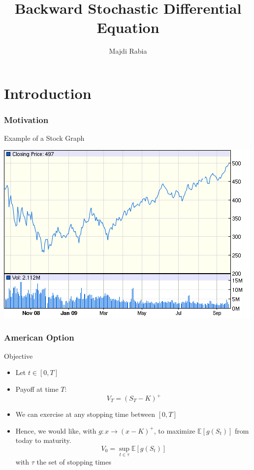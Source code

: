 \documentclass[10pt]{beamer}
\begin{document}
 
\title{\textbf{Backward Stochastic Differential Equation}}
\author{ Majdi Rabia}
\maketitle



\section{Introduction}

\begin{frame}
	\frametitle{Motivation}
	
	\begin{block}{Example of a Stock Graph}
	
	
	\centering
	\includegraphics[scale=0.5]{motivation.png}
\end{block}
	
	
\end{frame}



 \begin{frame}
 \frametitle{American Option}


\begin{block}{Objective}
	\begin{itemize}
		\item Let $t \in [0,T]$
		\item Payoff at time $T$: 
		\[V_T = (S_T - K)^+\]
		\item We can exercise at any stopping time between $[0, T]$
		\item Hence, we would like, with $g : x\rightarrow (x - K)^+$, to maximize $\mathbb{E}[g(S_t)]$ from today to maturity. 
		\[V_0 = \sup_{t \in \tau}\mathbb{E}[g(S_t)]\]
		with $\tau$ the set of stopping times
	\end{itemize}
\end{block}

 \end{frame}
 
\end{document}
